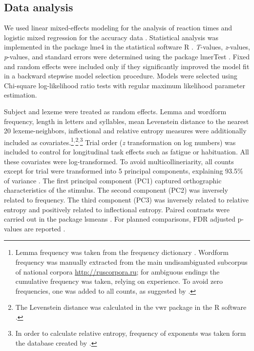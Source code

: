 \documentclass[output=paper, modfonts,newtxmath,hidelinks]{langscibook}
\begin{document}
\subsection{Data analysis} 
We used linear mixed-effects modeling for the analysis of reaction times and logistic mixed regression for the accuracy data  \citep{baayen2008analyzing}. Statistical analysis was implemented in the package lme4  \citep{bates2014lme4} in the statistical software R \citep{team2014r}. \textit{T}-values, \textit{z}-values, \textit{p}-values, and standard errors were determined using the package lmerTest \citep{kuznetsova2015package}. Fixed and random effects were included only if they significantly improved the model fit in a backward stepwise model selection procedure. Models were selected using Chi-square log-likelihood ratio tests with regular maximum likelihood parameter estimation. 

Subject and lexeme were treated as random effects. Lemma and wordform frequency, length in letters and syllables, mean Levenstein distance to the nearest 20 lexeme-neighbors, 
inflectional and relative entropy measures were additionally included as covariates.\footnote{Lemma 
  frequency was taken from the frequency dictionary \citep{lyashevskaya2009frequency}. Wordform frequency was manually extracted from the main undisambiguated subcorpus of  national corpora {\url{http://ruscorpora.ru}}; for ambiguous endings the cumulative frequency was taken,  relying on  experience. To avoid zero frequencies, one was added to all counts, as suggested by \citet*{brysbaert2013dealing}.}$^,$\footnote{The 
  Levenstein distance was calculated in the vwr package \citep{keuleers2013vwr} in the R software \citep{team2014r}.}$^,$\footnote{In 
  order to calculate relative entropy, frequency of exponents was taken form the database created by \citet*{samojlova2014frequencies}.} 
Trial order (\textit{z} transformation on log numbers) was included to control for longitudinal task effects such as fatigue or habituation. All these covariates were log-transformed. To avoid multicollineriarity, all counts except for trial were transformed into 5 principal components, explaining 93.5\% of variance \citep{baayen2008analyzing}. The first principal component (PC1) captured orthographic characteristics of the stimulus. The second component (PC2) was inversely related to frequency. The third component (PC3) was inversely related to relative entropy and positively related to inflectional entropy. Paired contrasts were carried out in the package lsmeans \citep{lenth2016least}. For planned comparisons, FDR adjusted p-values are reported \citep{benjamini1995controlling}. 
\end{document}
